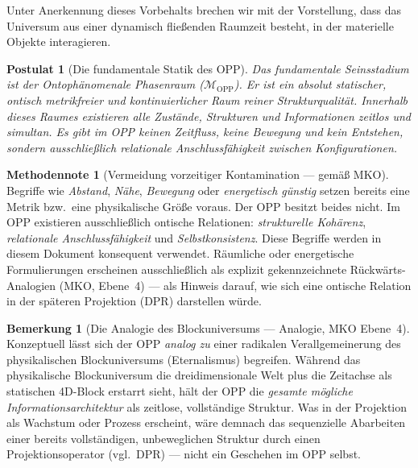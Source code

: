 \documentclass[11pt,a4paper]{article}
\theoremstyle{plain}
\newtheorem{postulate}{Postulat}[section]
\theoremstyle{definition}
\newtheorem{remark}{Bemerkung}[section]
\newtheorem{methodennote}{Methodennote}[section]
\begin{document}
Unter Anerkennung dieses Vorbehalts brechen wir mit der Vorstellung, dass das Universum
aus einer dynamisch flie\ss{}enden Raumzeit besteht, in der materielle Objekte
interagieren.

\begin{postulate}[Die fundamentale Statik des OPP]
Das fundamentale Seinsstadium ist der Ontoph\"{a}nomenale Phasenraum
($\mathcal{M}_{\text{OPP}}$). Er ist ein absolut statischer, ontisch metrikfreier und
kontinuierlicher Raum reiner Strukturqualit\"{a}t. Innerhalb dieses Raumes existieren
alle Zust\"{a}nde, Strukturen und Informationen \emph{zeitlos und simultan}. Es gibt im
OPP keinen Zeitfluss, keine Bewegung und kein Entstehen, sondern ausschlie\ss{}lich
relationale Anschlussf\"{a}higkeit zwischen Konfigurationen.
\end{postulate}

\begin{methodennote}[Vermeidung vorzeitiger Kontamination --- gem\"{a}\ss{} MKO]
Begriffe wie \emph{Abstand}, \emph{N\"{a}he}, \emph{Bewegung} oder
\emph{energetisch g\"{u}nstig} setzen bereits eine Metrik bzw.\ eine physikalische
Gr\"{o}\ss{}e voraus. Der OPP besitzt beides nicht. Im OPP existieren ausschlie\ss{}lich
ontische Relationen: \emph{strukturelle Koh\"{a}renz}, \emph{relationale
Anschlussf\"{a}higkeit} und \emph{Selbstkonsistenz}. Diese Begriffe werden in diesem
Dokument konsequent verwendet. R\"{a}umliche oder energetische Formulierungen erscheinen
ausschlie\ss{}lich als explizit gekennzeichnete R\"{u}ckw\"{a}rts-Analogien
(MKO, Ebene~4) --- als Hinweis darauf, wie sich eine ontische Relation in der sp\"{a}teren
Projektion (DPR) darstellen w\"{u}rde.
\end{methodennote}

\begin{remark}[Die Analogie des Blockuniversums --- {\normalfont Analogie, MKO Ebene~4}]
Konzeptuell l\"{a}sst sich der OPP \emph{analog zu} einer radikalen Verallgemeinerung
des physikalischen Blockuniversums (Eternalismus) begreifen. W\"{a}hrend das
physikalische Blockuniversum die dreidimensionale Welt plus die Zeitachse als
statischen 4D-Block erstarrt sieht, h\"{a}lt der OPP die \emph{gesamte m\"{o}gliche
Informationsarchitektur} als zeitlose, vollst\"{a}ndige Struktur. Was in der Projektion
als \glqq{}Wachstum\grqq{} oder \glqq{}Prozess\grqq{} erscheint, w\"{a}re demnach das
sequenzielle Abarbeiten einer bereits vollst\"{a}ndigen, unbeweglichen Struktur durch
einen Projektionsoperator (vgl.\ DPR) --- nicht ein Geschehen im OPP selbst.
\end{remark}
\end{document}
